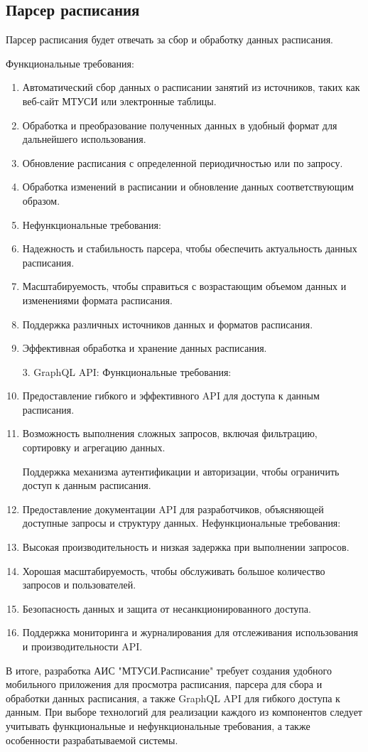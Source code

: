 \subsection{Парсер расписания}
Парсер расписания будет отвечать за сбор и обработку данных расписания. 

   Функциональные требования:
   \begin{enumerate}
      \item Автоматический сбор данных о расписании занятий из источников, таких как веб-сайт МТУСИ или электронные таблицы.
      \item Обработка и преобразование полученных данных в удобный формат для дальнейшего использования.
      \item Обновление расписания с определенной периодичностью или по запросу.
      \item Обработка изменений в расписании и обновление данных соответствующим образом.
    \item Нефункциональные требования:
      \item Надежность и стабильность парсера, чтобы обеспечить актуальность данных расписания.
      \item Масштабируемость, чтобы справиться с возрастающим объемом данных и изменениями формата расписания.
      \item Поддержка различных источников данных и форматов расписания.
      \item Эффективная обработка и хранение данных расписания.

3. GraphQL API:
   Функциональные требования:
      \item Предоставление гибкого и эффективного API для доступа к данным расписания.
      \item Возможность выполнения сложных запросов, включая фильтрацию, сортировку и агрегацию данных.
    

 Поддержка механизма аутентификации и авторизации, чтобы ограничить доступ к данным расписания.
      \item Предоставление документации API для разработчиков, объясняющей доступные запросы и структуру данных.
   Нефункциональные требования:
      \item Высокая производительность и низкая задержка при выполнении запросов.
      \item Хорошая масштабируемость, чтобы обслуживать большое количество запросов и пользователей.
      \item Безопасность данных и защита от несанкционированного доступа.
      \item Поддержка мониторинга и журналирования для отслеживания использования и производительности API.
    \end{enumerate}

В итоге, разработка АИС "МТУСИ.Расписание" требует создания удобного мобильного приложения для просмотра расписания, парсера для сбора и обработки данных расписания, а также GraphQL API для гибкого доступа к данным. При выборе технологий для реализации каждого из компонентов следует учитывать функциональные и нефункциональные требования, а также особенности разрабатываемой системы.